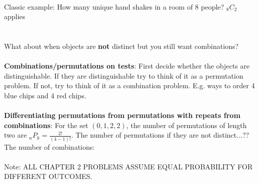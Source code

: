 \hfill \\
Classic example:  How many unique hand shakes in a room of 8 people?  ${_8}C_2$ applies \hfill \\
\hfill \\
\hfill \\
What about when objects are \textbf{not} distinct but you still want combinations? \hfill \\
\hfill \\

\textbf{Combinations/permutations on tests}: First decide whether the objects are distinguishable.  If they are distinguishable try to think of it as a permutation problem.  If not, try to think of it as a combination problem.  E.g. ways to order 4 blue chips and 4 red chips.  \hfill \\
\hfill \\

\textbf{Differentiating permutations from permutations with repeats from combinations}:
For the set $(0, 1, 2, 2)$, the number of permutations of length two are ${_n}P_k = \frac{2!}{(4-1)!}$.
The number of permutations if they are not distinct...??
The number of combinations:  \hfill \\
\hfill \\

Note: ALL CHAPTER 2 PROBLEMS ASSUME EQUAL PROBABILITY FOR DIFFERENT OUTCOMES.
	

  

    
    
    
    
    
    
    
    
    
